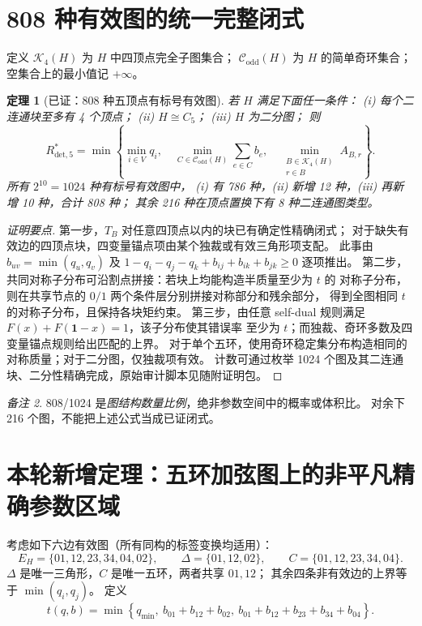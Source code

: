 \documentclass[11pt,a4paper]{ctexart}
\newtheorem{theorem}{定理}[section]
\theoremstyle{remark}\newtheorem{remark}[theorem]{备注}
\newcommand{\Rstar}{R^*_{\mathrm{det},5}}
\newcommand{\bx}{\mathbf{1}}
\newcommand{\codd}{\mathcal C_{\mathrm{odd}}}
\begin{document}
\section{808 种有效图的统一完整闭式}
定义 $\mathcal K_4(H)$ 为 $H$ 中四顶点完全子图集合；
$\codd(H)$ 为 $H$ 的简单奇环集合；空集合上的最小值记 $+\infty$。
\begin{theorem}[已证：808 种五顶点有标号有效图]
若 $H$ 满足下面任一条件：
(i) 每个二连通块至多有 4 个顶点；
(ii) $H\cong C_5$；
(iii) $H$ 为二分图；
则
\[
\boxed{\displaystyle
\Rstar=\min\left\{\min_{i\in V}q_i,\quad
\min_{C\in\codd(H)}\sum_{e\in C}b_e,\quad
\min_{\substack{B\in\mathcal K_4(H)\\r\in B}}A_{B,r}\right\}.}
\]
所有 $2^{10}=1024$ 种有标号有效图中，
(i) 有 786 种，(ii) 新增 12 种，(iii) 再新增 10 种，合计 808 种；
其余 216 种在顶点置换下有 8 种二连通图类型。
\end{theorem}
\begin{proof}[证明要点]
第一步，$T_B$ 对任意四顶点以内的块已有确定性精确闭式；
对于缺失有效边的四顶点块，四变量锚点项由某个独裁或有效三角形项支配。
此事由 $b_{uv}=\min(q_u,q_v)$ 及
$1-q_i-q_j-q_k+b_{ij}+b_{ik}+b_{jk}\ge0$ 逐项推出。
第二步，共同对称子分布可沿割点拼接：若块上均能构造半质量至少为 $t$ 的
对称子分布，则在共享节点的 $0/1$ 两个条件层分别拼接对称部分和残余部分，
得到全图相同 $t$ 的对称子分布，且保持各块矩约束。
第三步，由任意 self-dual 规则满足 $F(x)+F(\bx-x)=1$，该子分布使其错误率
至少为 $t$；而独裁、奇环多数及四变量锚点规则给出匹配的上界。
对于单个五环，使用奇环稳定集分布构造相同的对称质量；对于二分图，仅独裁项有效。
计数可通过枚举 1024 个图及其二连通块、二分性精确完成，原始审计脚本见随附证明包。
\end{proof}
\begin{remark}
808/1024 是\emph{图结构数量比例}，绝非参数空间中的概率或体积比。
对余下 216 个图，不能把上述公式当成已证闭式。
\end{remark}

\section{本轮新增定理：五环加弦图上的非平凡精确参数区域}
考虑如下六边有效图（所有同构的标签变换均适用）：
\[
E_H=\{01,12,23,34,04,02\},\qquad
\Delta=\{01,12,02\},\qquad
C=\{01,12,23,34,04\}.
\]
$\Delta$ 是唯一三角形，$C$ 是唯一五环，两者共享 $01,12$；
其余四条非有效边的上界等于 $\min(q_i,q_j)$。
定义
\[
\boxed{t(q,b)=\min\left\{
q_{\min},\ b_{01}+b_{12}+b_{02},\
 b_{01}+b_{12}+b_{23}+b_{34}+b_{04}\right\}.}
\]
\end{document}
